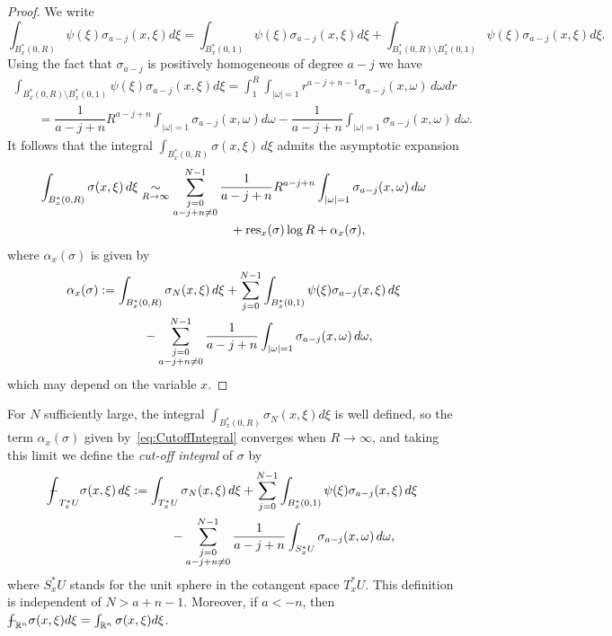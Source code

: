 \documentclass[11pt]{article}
\DeclareMathOperator{\res}{res} \DeclareMathOperator{\Res}{Res}
\begin{document}
\begin{proof}
We write
\[
\int_{B_x^*(0,R)}\psi(\xi)\sigma_{a-j}(x,\xi)d\xi=\int_{B_x^*(0,1)}\psi(\xi)\sigma_{a-j}(x,\xi)d\xi +\int_{B_x^*(0,R)\setminus B_x^*(0,1)}\psi(\xi)\sigma_{a-j}(x,\xi)d\xi.
\]
Using the fact that $\sigma_{a-j}$ is positively homogeneous of degree $a-j$ we have
\begin{gather*}
 \int_{B_x^*(0,R)\setminus B_x^*(0,1)}\psi(\xi)\sigma_{a-j}(x,\xi)d\xi=\int_1^R\int_{\vert\omega\vert=1}r^{a-j+n-1}\sigma_{a-j}(x,\omega)\,d\omega dr \\
\qquad{} =\dfrac{1}{a-j+n}R^{a-j+n} \int_{\vert\omega\vert=1}\sigma_{a-j}(x,\omega)d\omega-\dfrac{1}{a-j+n}\int_{\vert\omega\vert=1}\sigma_{a-j}(x,\omega)\,d\omega.
\end{gather*}
It follows that the integral $\int_{B_x^*(0,R)}\sigma(x,\xi)\,d\xi$ admits the asymptotic expansion
\begin{gather*}
\int_{B_x^*(0,R)}\sigma(x,\xi)\,d\xi\underset{R\to\infty}{\sim}\sum_{\substack{j=0\\a-j+n\not=0}}^{N-1} \frac{1}{a-j+n}R^{a-j+n}\int_{\vert\omega\vert=1}\sigma_{a-j}(x,\omega)\,d\omega \\
\hphantom{\int_{B_x^*(0,R)}\sigma(x,\xi)\,d\xi\underset{R\to\infty}{\sim}}{}
+{\res}_x(\sigma)\log R + \alpha_x(\sigma),
\end{gather*}
where $\alpha_x(\sigma)$ is given by
\begin{gather}
\alpha_x(\sigma) := \int_{B_x^*(0,R)}\sigma_N(x, \xi)\,d\xi+\sum_{j=0}^{N-1} \int_{B_x^*(0,1)} \psi(\xi)\sigma_{a-j}(x,\xi)\,d\xi\nonumber\\
\hphantom{\alpha_x(\sigma) :=}{}
-\sum_{\substack{j=0\\ a-j+n\not=0}}^{N-1} \dfrac{1}{a-j+n}\int_{\vert\omega\vert=1}\sigma_{a-j}(x,\omega)\,d\omega,\label{eq:CutoffIntegral}
\end{gather}
which may depend on the variable $x$.
\end{proof}

 For $N$ suf\/f\/iciently large, the integral $\int_{B_x^*(0,R)}\sigma_N(x,\xi)d\xi$ is well def\/ined, so the term $\alpha_x(\sigma)$ given by~\eqref{eq:CutoffIntegral} converges when $R\to\infty$, and taking this limit we def\/ine the \emph{cut-off integral} of $\sigma$ by
\begin{gather*}
{-\hskip -11,5pt\int}_{T^{*}_xU}\sigma(x,\xi)\,d\xi :=\int_{T^{*}_xU}\sigma_N(x,\xi)\,d\xi+\sum_{j=0}^{N-1} \int_{B^{*}_x(0,1)}\psi(\xi)\sigma_{a-j}(x,\xi)\,d\xi\\
\hphantom{{-\hskip -11,5pt\int}_{T^{*}_xU}\sigma(x,\xi)\,d\xi :=}{}  -\sum_{\substack{j=0\\ a-j+n\not=0}}^{N-1}\dfrac{1}{a-j+n}\int_{S^{*}_xU}\sigma_{a-j}(x,\omega)\,d\omega,
\end{gather*}
where $S^{*}_xU$ stands for the unit sphere in the cotangent space $T^{*}_xU$. This def\/inition is independent of $N>a+n-1$. Moreover, if $a<-n$, then ${-\hskip -10pt\int}_{\mathbb{R}^n}\sigma(x,\xi)d\xi=\int_{\mathbb{R}^n}\sigma(x,\xi)d\xi$.
\end{document}
